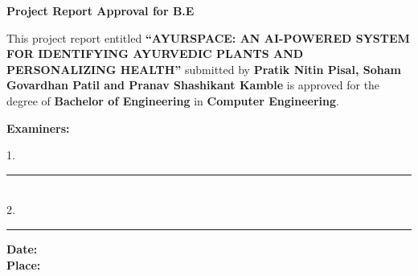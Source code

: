 \documentclass[12pt]{article}
\begin{document}
\begin{center}
  {\Large \textbf{Project Report Approval for B.E}}
\end{center}

\vspace{0.5cm}

\justifying

This project report entitled
\textbf{``AYURSPACE: AN AI-POWERED SYSTEM FOR IDENTIFYING AYURVEDIC PLANTS AND PERSONALIZING HEALTH''}
submitted by \textbf{Pratik Nitin Pisal, Soham Govardhan Patil and Pranav Shashikant Kamble}
is approved for the degree of \textbf{Bachelor of Engineering} in \textbf{Computer Engineering}.

\vspace{2cm}

\hspace{235pt} \textbf{Examiners:}

\begin{flushright}
1.\ \rule{7cm}{0.4pt} \vspace{2em} \\
2.\ \rule{7cm}{0.4pt}
\end{flushright}

\vfill

\noindent \textbf{Date:} \\[2em]
\textbf{Place:}
\end{document}
